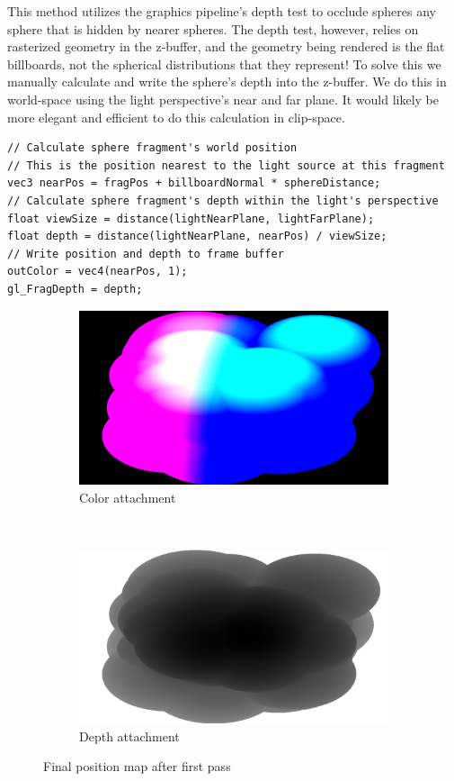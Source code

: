 This method utilizes the graphics pipeline's depth test to occlude spheres any sphere that is hidden by nearer spheres.
The depth test, however, relies on rasterized geometry in the z-buffer, and the geometry being rendered is the flat billboards, not the spherical distributions that they represent! To solve this we manually calculate and write the sphere's depth into the z-buffer. We do this in world-space using the light perspective's near and far plane. It would likely be more elegant and efficient to do this calculation in clip-space.
\begin{lstlisting}[caption={first\_voxelize.glsl, 60}]
// Calculate sphere fragment's world position 
// This is the position nearest to the light source at this fragment
vec3 nearPos = fragPos + billboardNormal * sphereDistance;
// Calculate sphere fragment's depth within the light's perspective
float viewSize = distance(lightNearPlane, lightFarPlane);
float depth = distance(lightNearPlane, nearPos) / viewSize;
// Write position and depth to frame buffer
outColor = vec4(nearPos, 1);
gl_FragDepth = depth;
\end{lstlisting}

\begin{figure}[h]
\centering
	\begin{subfigure}[t]{0.48\textwidth}
	\includegraphics[width=\textwidth]{../res/positionmapcolor.png}
	\caption{Color attachment}
	\end{subfigure}
	~
	\begin{subfigure}[t]{0.48\textwidth}
	\includegraphics[width=\textwidth]{../res/positionmapdepth.png}
	\caption{Depth attachment}
	\end{subfigure}
\caption{Final position map after first pass}
\end{figure}

